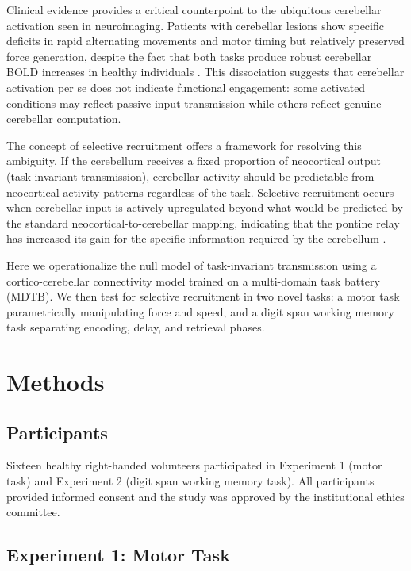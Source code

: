 \documentclass[11pt]{article}
\begin{document}
Clinical evidence provides a critical counterpoint to the ubiquitous cerebellar activation seen in neuroimaging. Patients with cerebellar lesions show specific deficits in rapid alternating movements and motor timing but relatively preserved force generation, despite the fact that both tasks produce robust cerebellar BOLD increases in healthy individuals \citep{spencer2003,bastian2006}. This dissociation suggests that cerebellar activation per se does not indicate functional engagement: some activated conditions may reflect passive input transmission while others reflect genuine cerebellar computation.

The concept of selective recruitment offers a framework for resolving this ambiguity. If the cerebellum receives a fixed proportion of neocortical output (task-invariant transmission), cerebellar activity should be predictable from neocortical activity patterns regardless of the task. Selective recruitment occurs when cerebellar input is actively upregulated beyond what would be predicted by the standard neocortical-to-cerebellar mapping, indicating that the pontine relay has increased its gain for the specific information required by the cerebellum \citep{ramnani2006,allen2005}.

Here we operationalize the null model of task-invariant transmission using a cortico-cerebellar connectivity model trained on a multi-domain task battery (MDTB). We then test for selective recruitment in two novel tasks: a motor task parametrically manipulating force and speed, and a digit span working memory task separating encoding, delay, and retrieval phases.

\section{Methods}

\subsection{Participants}

Sixteen healthy right-handed volunteers participated in Experiment 1 (motor task) and Experiment 2 (digit span working memory task). All participants provided informed consent and the study was approved by the institutional ethics committee.

\subsection{Experiment 1: Motor Task}
\end{document}
